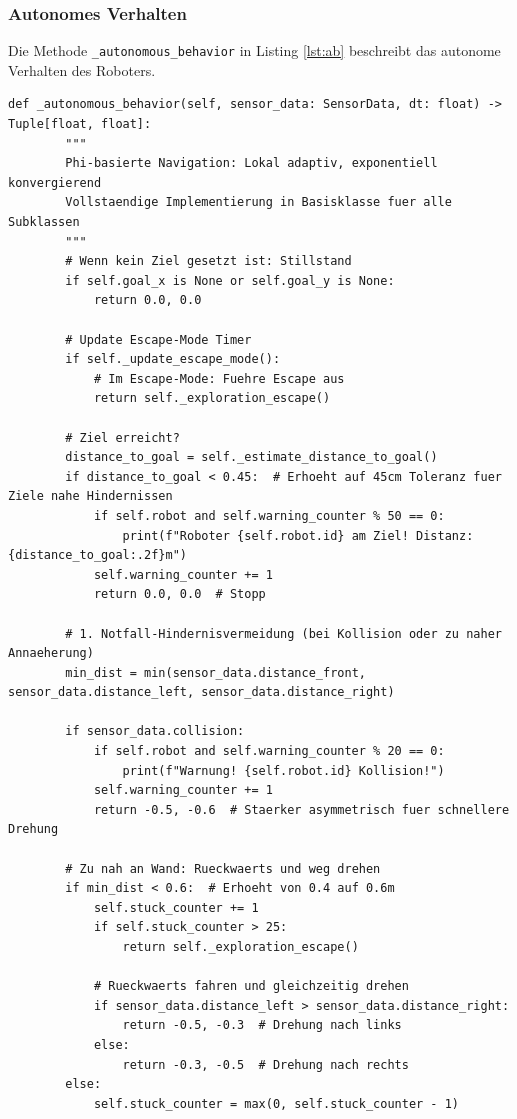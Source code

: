 ﻿\documentclass[a4paper,12pt]{article}
\theoremstyle{definition}
\begin{document}
\subsubsection{Autonomes Verhalten}

Die Methode \texttt{\_autonomous\_behavior} in Listing \ref{lst:ab} beschreibt das autonome Verhalten des Roboters.
\begin{lstlisting}[style=pythonstyle, caption={Methode \texttt{\_autonomous\_behavior}}, label={lst:ab}]
def _autonomous_behavior(self, sensor_data: SensorData, dt: float) -> Tuple[float, float]:
        """
        Phi-basierte Navigation: Lokal adaptiv, exponentiell konvergierend
        Vollstaendige Implementierung in Basisklasse fuer alle Subklassen
        """
        # Wenn kein Ziel gesetzt ist: Stillstand
        if self.goal_x is None or self.goal_y is None:
            return 0.0, 0.0
        
        # Update Escape-Mode Timer
        if self._update_escape_mode():
            # Im Escape-Mode: Fuehre Escape aus
            return self._exploration_escape()
        
        # Ziel erreicht?
        distance_to_goal = self._estimate_distance_to_goal()
        if distance_to_goal < 0.45:  # Erhoeht auf 45cm Toleranz fuer Ziele nahe Hindernissen
            if self.robot and self.warning_counter % 50 == 0:
                print(f"Roboter {self.robot.id} am Ziel! Distanz: {distance_to_goal:.2f}m")
            self.warning_counter += 1
            return 0.0, 0.0  # Stopp
        
        # 1. Notfall-Hindernisvermeidung (bei Kollision oder zu naher Annaeherung)
        min_dist = min(sensor_data.distance_front, sensor_data.distance_left, sensor_data.distance_right)
        
        if sensor_data.collision:
            if self.robot and self.warning_counter % 20 == 0:
                print(f"Warnung! {self.robot.id} Kollision!")
            self.warning_counter += 1
            return -0.5, -0.6  # Staerker asymmetrisch fuer schnellere Drehung
        
        # Zu nah an Wand: Rueckwaerts und weg drehen
        if min_dist < 0.6:  # Erhoeht von 0.4 auf 0.6m
            self.stuck_counter += 1
            if self.stuck_counter > 25:
                return self._exploration_escape()
            
            # Rueckwaerts fahren und gleichzeitig drehen
            if sensor_data.distance_left > sensor_data.distance_right:
                return -0.5, -0.3  # Drehung nach links
            else:
                return -0.3, -0.5  # Drehung nach rechts
        else:
            self.stuck_counter = max(0, self.stuck_counter - 1)
        

\end{lstlisting}
\end{document}
